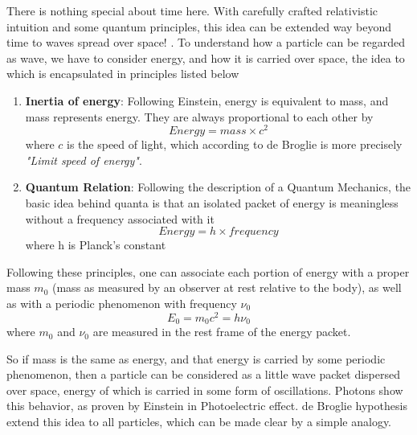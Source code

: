 \documentclass[11pt, a4paper]{article}
\begin{document}
There is nothing special about time here. With carefully crafted relativistic intuition and some quantum principles, this idea can be extended way beyond time to waves spread over space! \cite{de_broglie_thesis}. To understand how a particle can be regarded as wave, we have to consider energy, and how it is carried over space, the idea to which is encapsulated in principles listed below
\begin{enumerate}
	\item \textbf{Inertia of energy}: Following Einstein, energy is equivalent to mass, and mass represents energy. They are always proportional to each other by
	\begin{equation*}
		Energy = mass \times c^{2}
	\end{equation*}
	where $c$ is the speed of light, which according to de Broglie is more precisely \textit{"Limit speed of energy"}.
	\item \textbf{Quantum Relation}: Following the description of a Quantum Mechanics, the basic idea behind quanta is that an isolated packet of energy is meaningless without a frequency associated with it
	\begin{equation*}
		Energy = h \times frequency
	\end{equation*}
	where h is Planck's constant
\end{enumerate}
Following these principles, one can associate each portion of energy with a proper mass $m_{0}$ (mass as measured by an observer at rest relative to the body), as well as with a periodic phenomenon with frequency $\nu_{0}$ 
\begin{equation*}
	E_{0} = m_{0}c^{2} = h \nu_{0}
\end{equation*}
where $m_{0}$ and $\nu_{0}$ are measured in the rest frame of the energy packet.

So if mass is the same as energy, and that energy is carried by some periodic phenomenon, then a particle can be considered as a little wave packet dispersed over space, energy of which is carried in some form of oscillations. Photons show this behavior, as proven by Einstein in Photoelectric effect. de Broglie hypothesis extend this idea to all particles, which can be made clear by a simple analogy.
\end{document}
